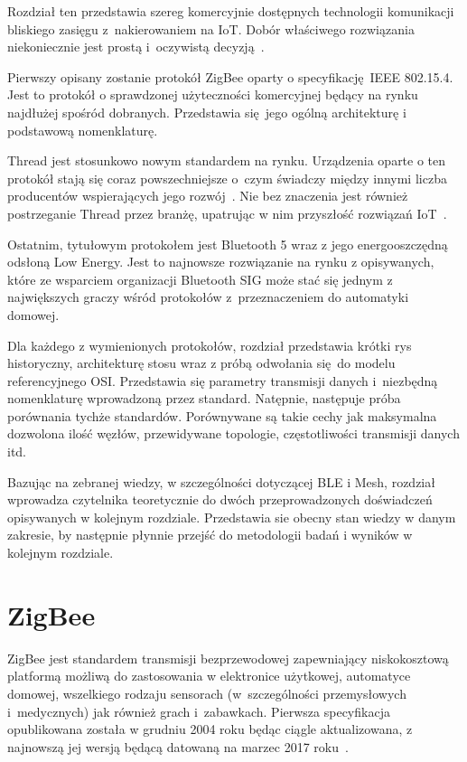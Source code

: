 Rozdział ten przedstawia szereg komercyjnie dostępnych technologii komunikacji
bliskiego zasięgu z~nakierowaniem na \gls{IoT}. Dobór właściwego rozwiązania
niekoniecznie jest prostą i~oczywistą decyzją~\cite{lethaby_wireless_2017, ray_edge_2019}.

Pierwszy opisany zostanie protokół ZigBee oparty o specyfikację IEEE 802.15.4. Jest to protokół
o sprawdzonej użyteczności komercyjnej będący na rynku najdłużej spośród dobranych.
Przedstawia się jego ogólną architekturę i podstawową nomenklaturę.

Thread jest stosunkowo nowym standardem na rynku. Urządzenia oparte o ten protokół stają
się coraz powszechniejsze o~czym świadczy między innymi liczba producentów wspierających
jego rozwój~\cite{noauthor_thread_nodate-1}. Nie bez znaczenia jest również postrzeganie
Thread przez branżę, upatrując w nim przyszłość rozwiązań IoT~\cite{curtis_ces_nodate-1}.

Ostatnim, tytułowym protokołem jest Bluetooth 5 wraz z jego energooszczędną odsłoną
Low Energy. Jest to najnowsze rozwiązanie na rynku z opisywanych, które ze wsparciem
organizacji Bluetooth SIG może stać się jednym z największych graczy wśród protokołów
z~przeznaczeniem do automatyki domowej.

Dla każdego z wymienionych protokołów, rozdział przedstawia krótki rys historyczny,
architekturę stosu wraz z próbą odwołania się do modelu referencyjnego OSI. Przedstawia
się parametry transmisji danych i~niezbędną nomenklaturę wprowadzoną przez standard.
Natępnie, następuje próba porównania tychże standardów. Porównywane są takie
cechy jak maksymalna dozwolona ilość węzłów, przewidywane topologie,
częstotliwości transmisji danych itd.

Bazując na zebranej wiedzy, w szczególności dotyczącej BLE i Mesh, rozdział wprowadza
czytelnika teoretycznie do dwóch przeprowadzonych doświadczeń opisywanych w kolejnym
rozdziale. Przedstawia sie obecny stan wiedzy w danym zakresie, by następnie płynnie
przejść do metodologii badań i wyników w kolejnym rozdziale.

\section{ZigBee}

ZigBee jest standardem transmisji bezprzewodowej zapewniający niskokosztową platformą
możliwą do zastosowania w elektronice użytkowej, automatyce domowej, wszelkiego rodzaju sensorach
(w~szczególności przemysłowych i~medycznych) jak również grach i~zabawkach.
Pierwsza specyfikacja opublikowana została w grudniu 2004 roku będąc ciągle aktualizowana,
z najnowszą jej wersją będącą datowaną na marzec 2017 roku~\cite{zigbee_alliance_zigbee_2017}.

